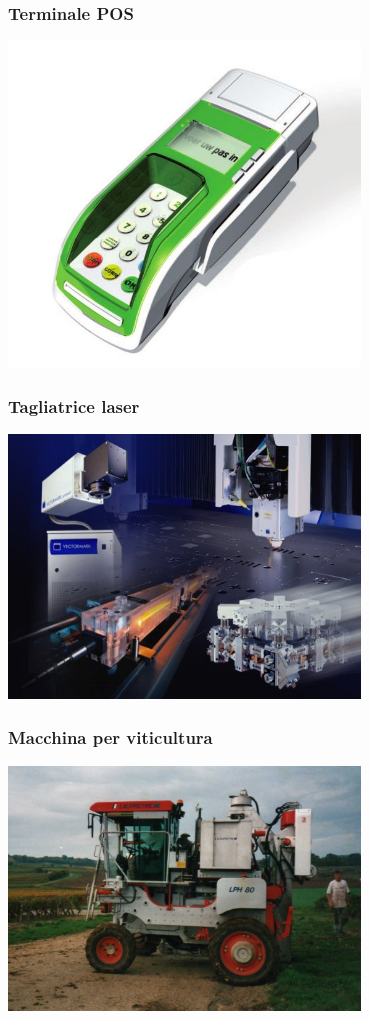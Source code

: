 \documentclass[xetex,table]{beamer}
\begin{document}
\begin{frame}
\frametitle{Terminale POS}
  \begin{center}
    \includegraphics[width=0.7\textwidth]{images/point-of-sale.jpg}
  \end{center}
\end{frame}

\begin{frame}
\frametitle{Tagliatrice laser}
  \begin{center}
    \includegraphics[width=0.7\textwidth]{images/laser-cutting-machine.jpg}
  \end{center}
\end{frame}

\begin{frame}
\frametitle{Macchina per viticultura}
  \begin{center}
    \includegraphics[width=0.7\textwidth]{images/viticulture-machine.jpg}
  \end{center}
\end{frame}
\end{document}
